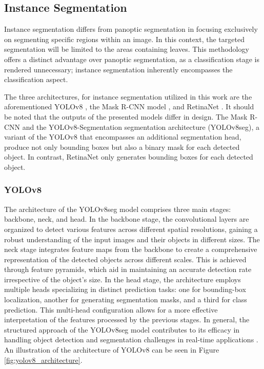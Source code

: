 \documentclass[draft,final]{vutinfth} %
\begin{document}
\subsection{Instance Segmentation} \label{sec:meth_instance}

Instance segmentation differs from panoptic segmentation in focusing exclusively on segmenting specific regions within an image. In this context, the targeted segmentation will be limited to the areas containing leaves. This methodology offers a distinct advantage over panoptic segmentation, as a classification stage is rendered unnecessary; instance segmentation inherently encompasses the classification aspect.

The three architectures, for instance segmentation utilized in this work are the aforementioned YOLOv8 \cite{yao_hp-yolov8_2024, jocher_ultralytics_2023}, the Mask R-CNN model \cite{he_mask_2018}, and RetinaNet \cite{lin_focal_2018}. 
It should be noted that the outputs of the presented models differ in design. The Mask R-CNN and the YOLOv8-Segmentation segmentation architecture (YOLOv8seg), a variant of the YOLOv8 that encompasses an additional segmentation head, produce not only bounding boxes but also a binary mask for each detected object. In contrast, RetinaNet only generates bounding boxes for each detected object.

\subsubsection{YOLOv8} \label{sec:yolo_arch}
The architecture of the YOLOv8seg model comprises three main stages: backbone, neck, and head. In the backbone stage, the convolutional layers are organized to detect various features across different spatial resolutions, gaining a robust understanding of the input images and their objects in different sizes. The neck stage integrates feature maps from the backbone to create a comprehensive representation of the detected objects across different scales. This is achieved through feature pyramids, which aid in maintaining an accurate detection rate irrespective of the object's size. In the head stage, the architecture employs multiple heads specializing in distinct prediction tasks: one for bounding-box localization, another for generating segmentation masks, and a third for class prediction. This multi-head configuration allows for a more effective interpretation of the features processed by the previous stages. In general, the structured approach of the YOLOv8seg model contributes to its efficacy in handling object detection and segmentation challenges in real-time applications \cite{pedro_detailed_2023, timilsina_yolov8_2024}. An illustration of the architecture of YOLOv8 can be seen in Figure \ref{fig:yolov8_architecture}.
\end{document}
